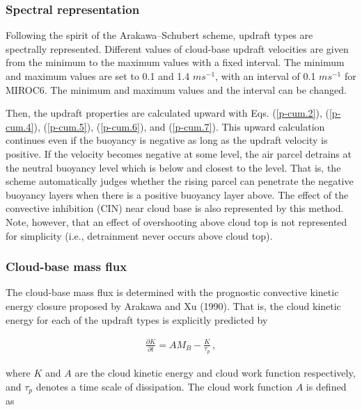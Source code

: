 \hypertarget{spectral-representation}{%
\subsubsection{Spectral representation}\label{spectral-representation}}

Following the spirit of the Arakawa--Schubert scheme, updraft types are
spectrally represented. Different values of cloud-base updraft
velocities are given from the minimum to the maximum values with a fixed
interval. The minimum and maximum values are set to 0.1 and 1.4
\(m s^{-1}\), with an interval of 0.1 \(m s^{-1}\) for MIROC6. The
minimum and maximum values and the interval can be changed.

Then, the updraft properties are calculated upward with Eqs.
(\ref{p-cum.2}), (\ref{p-cum.4}), (\ref{p-cum.5}),
(\ref{p-cum.6}), and (\ref{p-cum.7}). This upward calculation
continues even if the buoyancy is negative as long as the updraft
velocity is positive. If the velocity becomes negative at some level,
the air parcel detrains at the neutral buoyancy level which is below and
closest to the level. That is, the scheme automatically judges whether
the rising parcel can penetrate the negative buoyancy layers when there
is a positive buoyancy layer above. The effect of the convective
inhibition (CIN) near cloud base is also represented by this method.
Note, however, that an effect of overshooting above cloud top is not
represented for simplicity (i.e., detrainment never occurs above cloud
top).

\hypertarget{cloud-base-mass-flux}{%
\subsubsection{Cloud-base mass flux}\label{cloud-base-mass-flux}}

The cloud-base mass flux is determined with the prognostic convective
kinetic energy closure proposed by Arakawa and Xu (1990). That is, the
cloud kinetic energy for each of the updraft types is explicitly
predicted by

\begin{eqnarray}
 \frac{\partial K}{\partial t} = AM_B - \frac{K}{\tau_p}\,,  \label{p-cum.8}
\end{eqnarray}

where \(K\) and \(A\) are the cloud kinetic energy and cloud work
function respectively, and \(\tau_p\) denotes a time scale of
dissipation. The cloud work function \(A\) is defined as

